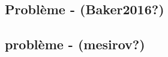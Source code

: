 \documentclass[9pt,twocolumn,twoside,]{pnas-new}
\begin{document}
\hypertarget{probluxe8me---baker2016}{%
\subsection{\texorpdfstring{Problème -
(\textbf{Baker2016?})}{Problème - (Baker2016?)}}\label{probluxe8me---baker2016}}

\hypertarget{probluxe8me---mesirov}{%
\subsection{\texorpdfstring{problème -
(\textbf{mesirov?})}{problème - (mesirov?)}}\label{probluxe8me---mesirov}}



% 
\end{document}

